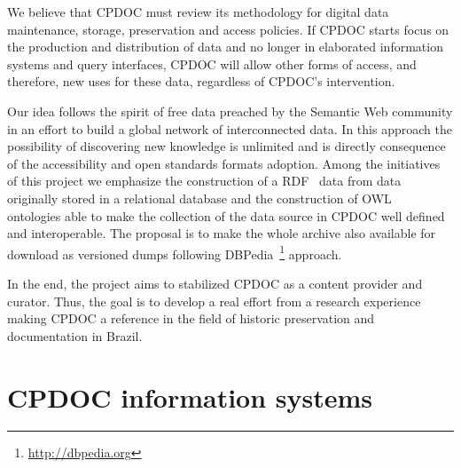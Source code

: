\documentclass{llncs}
\begin{document}
We believe that CPDOC must review its methodology for digital data
maintenance, storage, preservation and access policies. If CPDOC
starts focus on the production and distribution of data and no longer
in elaborated information systems and query interfaces, CPDOC will
allow other forms of access, and therefore, new uses for these data,
regardless of CPDOC's intervention.

Our idea follows the spirit of free data preached by the Semantic Web
community in an effort to build a global network of interconnected
data. In this approach the possibility of discovering new knowledge is
unlimited and is directly consequence of the accessibility and open
standards formats adoption. Among the initiatives of this project we
emphasize the construction of a RDF~\cite{rdf-primer} data from data
originally stored in a relational database and the construction of
OWL~\cite{owl} ontologies able to make the collection of the data
source in CPDOC well defined and interoperable. The proposal is to
make the whole archive also available for download as versioned dumps
following DBPedia~\footnote{\url{http://dbpedia.org}} approach.

In the end, the project aims to stabilized CPDOC as a content
provider and curator. Thus, the goal is to develop a real effort from
a research experience making CPDOC a reference in the field of
historic preservation and documentation in Brazil.


\section{CPDOC information systems}


\end{document}
